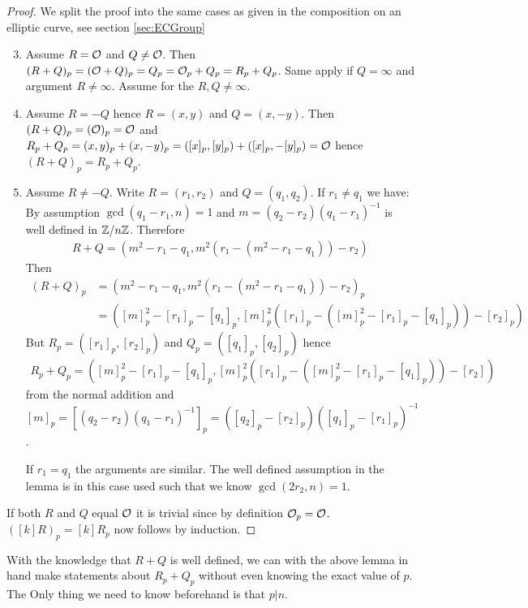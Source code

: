 \begin{proof}
We split the proof into the same cases as given in the composition on an elliptic curve, see section \ref{sec:ECGroup}
\begin{enumerate}[(1)]
\setcounter{enumi}{2}
\item Assume $R=\mathcal{O}$ and $Q\neq \mathcal{O}$. Then $(R+Q)_p=(\mathcal{O}+Q)_p=Q_p=\mathcal{O}_p+Q_p=R_p+Q_p$. Same apply if $Q=\infty$ and argument $R\neq \infty$. Assume for the $R,Q\neq \infty$.
\item Assume $R=-Q$ hence $R=(x,y)$ and $Q=(x,-y)$. Then $(R+Q)_p=(\mathcal{O})_p=\mathcal{O}$ and $R_p+Q_p=(x,y)_p+(x,-y)_p=([x]_p,[y]_p)+([x]_p,-[y]_p)=\mathcal{O}$ hence $(R+Q)_p=R_p+Q_p$. 
\item Assume $R\neq -Q$. Write $R=(r_1,r_2)$ and $Q=(q_1,q_2)$. If $r_1\neq q_1$ we have: By assumption $\gcd(q_1-r_1,n)=1$ and $m=(q_2-r_2)(q_1-r_1)^{-1}$ is well defined in $\mathbb{Z}/n\mathbb{Z}$. Therefore
\begin{align*}
	R+Q=\left( m^2-r_1-q_1, m^2\left(r_1-\left(m^2-r_1-q_1\right)\right)-r_2\right)
\end{align*}
Then 
\begin{align*}
	(R+Q)_p &= \left( m^2-r_1-q_1, m^2\left(r_1-\left(m^2-r_1-q_1\right)\right)-r_2\right)_p \\
			&= \left( [m]_p^2-[r_1]_p-[q_1]_p, [m]_p^2\left([r_1]_p-\left([m]_p^2-[r_1]_p-[q_1]_p\right)\right)-[r_2]_p\right)
\end{align*}
But $R_p=([r_1]_p,[r_2]_p)$ and $Q_p=([q_1]_p,[q_2]_p)$ hence 
\begin{align*}
 R_p+Q_p=\left( [m]_p^2-[r_1]_p-[q_1]_p, [m]_p^2\left([r_1]_p-\left([m]_p^2-[r_1]_p-[q_1]_p\right)\right)-[r_2]\right)
\end{align*}
from the normal addition and $[m]_p=[(q_2-r_2)(q_1-r_1)^{-1}]_p=([q_2]_p-[r_2]_p)([q_1]_p-[r_1]_p)^{-1}$.

If $r_1=q_1$ the arguments are similar. The well defined assumption in the lemma is in this case used such that we know $\gcd(2r_2,n)=1$. 
\end{enumerate}
If both $R$ and $Q$ equal $\mathcal{O}$ it is trivial since by definition $\mathcal{O}_p=\mathcal{O}$. $([k]R)_p=[k]R_p$ now follows by induction. 
\end{proof}
With the knowledge that $R+Q$ is well defined, we can with the above lemma in hand make statements about $R_p+Q_p$ without even knowing the exact value of $p$. The Only thing we need to know beforehand is that $p\vert n$. 
